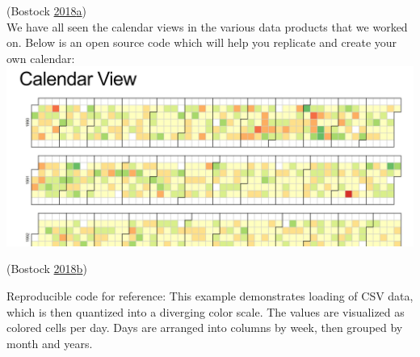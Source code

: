 \documentclass[]{book}
\begin{document}
(Bostock
\protect\hyperlink{ref-Calendar_Layout}{2018}\protect\hyperlink{ref-Calendar_Layout}{a})\\
We have all seen the calendar views in the various data products that we
worked on. Below is an open source code which will help you replicate
and create your own calendar: \includegraphics{images/CalendarView.jpg}

(Bostock
\protect\hyperlink{ref-CalendarView}{2018}\protect\hyperlink{ref-CalendarView}{b})

Reproducible code for reference: This example demonstrates loading of
CSV data, which is then quantized into a diverging color scale. The
values are visualized as colored cells per day. Days are arranged into
columns by week, then grouped by month and years.
\end{document}
